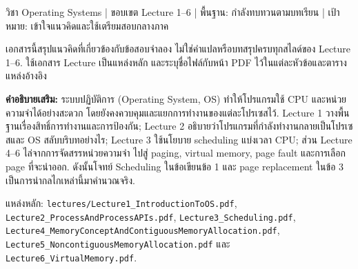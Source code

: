 \noindent วิชา Operating Systems | ขอบเขต Lecture 1--6 | พื้นฐาน: กำลังทบทวนตามบทเรียน | เป้าหมาย: เข้าใจแนวคิดและใช้เตรียมสอบกลางภาค\par
\noindent เอกสารนี้สรุปแนวคิดที่เกี่ยวข้องกับข้อสอบจำลอง ไม่ใช่คำแปลหรือบทสรุปครบทุกสไลด์ของ Lecture 1--6. ใช้เอกสาร Lecture เป็นแหล่งหลัก และระบุชื่อไฟล์กับหน้า PDF ไว้ในแต่ละหัวข้อและตารางแหล่งอ้างอิง\par\medskip

\noindent\textbf{คำอธิบายเสริม:} ระบบปฏิบัติการ (Operating System, OS) ทำให้โปรแกรมใช้ CPU และหน่วยความจำได้อย่างสะดวก โดยยังคงควบคุมและแยกการทำงานของแต่ละโปรเซสไว้. Lecture 1 วางพื้นฐานเรื่องสิทธิ์การทำงานและการป้องกัน; Lecture 2 อธิบายว่าโปรแกรมที่กำลังทำงานกลายเป็นโปรเซสและ OS สลับบริบทอย่างไร; Lecture 3 ใช้นโยบาย scheduling แบ่งเวลา CPU; ส่วน Lecture 4--6 ไล่จากการจัดสรรหน่วยความจำ ไปสู่ paging, virtual memory, page fault และการเลือก page ที่จะนำออก. ดังนั้นโจทย์ Scheduling ในข้อเขียนข้อ 1 และ page replacement ในข้อ 3 เป็นการนำกลไกเหล่านี้มาคำนวณจริง.\par
\noindent แหล่งหลัก: \texttt{lectures/Lecture1\_IntroductionToOS.pdf}, \texttt{Lecture2\_ProcessAndProcessAPIs.pdf}, \texttt{Lecture3\_Scheduling.pdf}, \texttt{Lecture4\_MemoryConceptAndContiguousMemoryAllocation.pdf}, \texttt{Lecture5\_NoncontiguousMemoryAllocation.pdf} และ \texttt{Lecture6\_VirtualMemory.pdf}.\par\medskip

